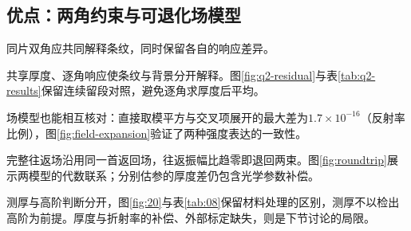 \subsection{优点：两角约束与可退化场模型}

同片双角应共同解释条纹，同时保留各自的响应差异。

共享厚度、逐角响应使条纹与背景分开解释。图\ref{fig:q2-residual}与表\ref{tab:q2-results}保留连续留段对照，避免逐角求厚度后平均。

场模型也能相互核对：直接取模平方与交叉项展开的最大差为$1.7\times10^{-16}$（反射率比例），图\ref{fig:field-expansion}验证了两种强度表达的一致性。

完整往返场沿用同一首返回场，往返振幅比趋零即退回两束。图\ref{fig:roundtrip}展示两模型的代数联系；分别估参的厚度差仍包含光学参数补偿。

测厚与高阶判断分开，图\ref{fig:20}与表\ref{tab:08}保留材料处理的区别，测厚不以检出高阶为前提。厚度与折射率的补偿、外部标定缺失，则是下节讨论的局限。
